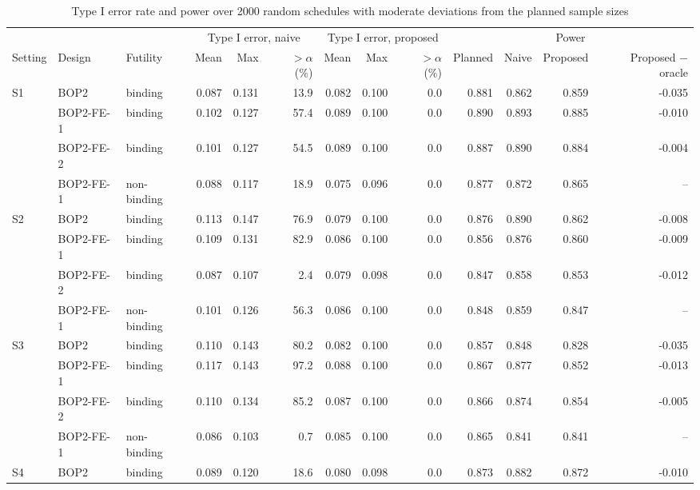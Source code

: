\begin{table}
\centering
\caption{Type I error rate and power over 2000 random schedules with moderate deviations from the planned sample sizes}
\label{tab:random}
\scriptsize
\begin{tabular}{lllrrrrrrrrrr}
\toprule
 & & & \multicolumn{3}{c}{Type I error, naive} & \multicolumn{3}{c}{Type I error, proposed} & \multicolumn{4}{c}{Power} \\
\cmidrule(lr){4-6}\cmidrule(lr){7-9}\cmidrule(lr){10-13}
Setting & Design & Futility & Mean & Max & $>\alpha$ (\%) & Mean & Max & $>\alpha$ (\%) & Planned & Naive & Proposed & Proposed $-$ oracle \\
\midrule
S1 & BOP2 & binding & 0.087 & 0.131 & 13.9 & 0.082 & 0.100 & 0.0 & 0.881 & 0.862 & 0.859 & -0.035 \\
 & BOP2-FE-1 & binding & 0.102 & 0.127 & 57.4 & 0.089 & 0.100 & 0.0 & 0.890 & 0.893 & 0.885 & -0.010 \\
 & BOP2-FE-2 & binding & 0.101 & 0.127 & 54.5 & 0.089 & 0.100 & 0.0 & 0.887 & 0.890 & 0.884 & -0.004 \\
 & BOP2-FE-1 & non-binding & 0.088 & 0.117 & 18.9 & 0.075 & 0.096 & 0.0 & 0.877 & 0.872 & 0.865 & -- \\
\midrule
S2 & BOP2 & binding & 0.113 & 0.147 & 76.9 & 0.079 & 0.100 & 0.0 & 0.876 & 0.890 & 0.862 & -0.008 \\
 & BOP2-FE-1 & binding & 0.109 & 0.131 & 82.9 & 0.086 & 0.100 & 0.0 & 0.856 & 0.876 & 0.860 & -0.009 \\
 & BOP2-FE-2 & binding & 0.087 & 0.107 & 2.4 & 0.079 & 0.098 & 0.0 & 0.847 & 0.858 & 0.853 & -0.012 \\
 & BOP2-FE-1 & non-binding & 0.101 & 0.126 & 56.3 & 0.086 & 0.100 & 0.0 & 0.848 & 0.859 & 0.847 & -- \\
\midrule
S3 & BOP2 & binding & 0.110 & 0.143 & 80.2 & 0.082 & 0.100 & 0.0 & 0.857 & 0.848 & 0.828 & -0.035 \\
 & BOP2-FE-1 & binding & 0.117 & 0.143 & 97.2 & 0.088 & 0.100 & 0.0 & 0.867 & 0.877 & 0.852 & -0.013 \\
 & BOP2-FE-2 & binding & 0.110 & 0.134 & 85.2 & 0.087 & 0.100 & 0.0 & 0.866 & 0.874 & 0.854 & -0.005 \\
 & BOP2-FE-1 & non-binding & 0.086 & 0.103 & 0.7 & 0.085 & 0.100 & 0.0 & 0.865 & 0.841 & 0.841 & -- \\
\midrule
S4 & BOP2 & binding & 0.089 & 0.120 & 18.6 & 0.080 & 0.098 & 0.0 & 0.873 & 0.882 & 0.872 & -0.010 \\

\end{tabular}
\end{table}
